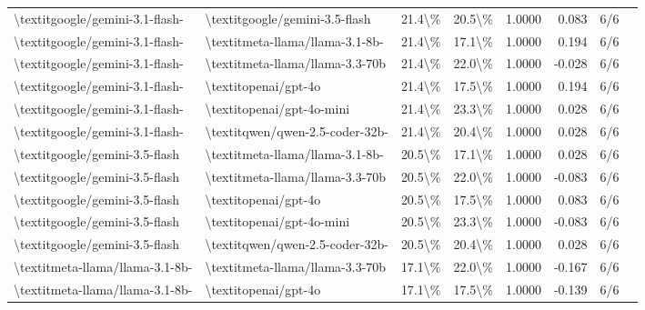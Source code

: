 \begin{table}[htbp]
{\begin{tabular}{ll|rrrrrl}
\textbackslash{}textit{google/gemini-3.1-flash-} & \textbackslash{}textit{google/gemini-3.5-flash} & 21.4\textbackslash{}\% & 20.5\textbackslash{}\% & 1.0000 & 0.083 & 6/6 \\
\textbackslash{}textit{google/gemini-3.1-flash-} & \textbackslash{}textit{meta-llama/llama-3.1-8b-} & 21.4\textbackslash{}\% & 17.1\textbackslash{}\% & 1.0000 & 0.194 & 6/6 \\
\textbackslash{}textit{google/gemini-3.1-flash-} & \textbackslash{}textit{meta-llama/llama-3.3-70b} & 21.4\textbackslash{}\% & 22.0\textbackslash{}\% & 1.0000 & -0.028 & 6/6 \\
\textbackslash{}textit{google/gemini-3.1-flash-} & \textbackslash{}textit{openai/gpt-4o} & 21.4\textbackslash{}\% & 17.5\textbackslash{}\% & 1.0000 & 0.194 & 6/6 \\
\textbackslash{}textit{google/gemini-3.1-flash-} & \textbackslash{}textit{openai/gpt-4o-mini} & 21.4\textbackslash{}\% & 23.3\textbackslash{}\% & 1.0000 & 0.028 & 6/6 \\
\textbackslash{}textit{google/gemini-3.1-flash-} & \textbackslash{}textit{qwen/qwen-2.5-coder-32b-} & 21.4\textbackslash{}\% & 20.4\textbackslash{}\% & 1.0000 & 0.028 & 6/6 \\
\textbackslash{}textit{google/gemini-3.5-flash} & \textbackslash{}textit{meta-llama/llama-3.1-8b-} & 20.5\textbackslash{}\% & 17.1\textbackslash{}\% & 1.0000 & 0.028 & 6/6 \\
\textbackslash{}textit{google/gemini-3.5-flash} & \textbackslash{}textit{meta-llama/llama-3.3-70b} & 20.5\textbackslash{}\% & 22.0\textbackslash{}\% & 1.0000 & -0.083 & 6/6 \\
\textbackslash{}textit{google/gemini-3.5-flash} & \textbackslash{}textit{openai/gpt-4o} & 20.5\textbackslash{}\% & 17.5\textbackslash{}\% & 1.0000 & 0.083 & 6/6 \\
\textbackslash{}textit{google/gemini-3.5-flash} & \textbackslash{}textit{openai/gpt-4o-mini} & 20.5\textbackslash{}\% & 23.3\textbackslash{}\% & 1.0000 & -0.083 & 6/6 \\
\textbackslash{}textit{google/gemini-3.5-flash} & \textbackslash{}textit{qwen/qwen-2.5-coder-32b-} & 20.5\textbackslash{}\% & 20.4\textbackslash{}\% & 1.0000 & 0.028 & 6/6 \\
\textbackslash{}textit{meta-llama/llama-3.1-8b-} & \textbackslash{}textit{meta-llama/llama-3.3-70b} & 17.1\textbackslash{}\% & 22.0\textbackslash{}\% & 1.0000 & -0.167 & 6/6 \\
\textbackslash{}textit{meta-llama/llama-3.1-8b-} & \textbackslash{}textit{openai/gpt-4o} & 17.1\textbackslash{}\% & 17.5\textbackslash{}\% & 1.0000 & -0.139 & 6/6 \\

\end{tabular}}
\end{table}
